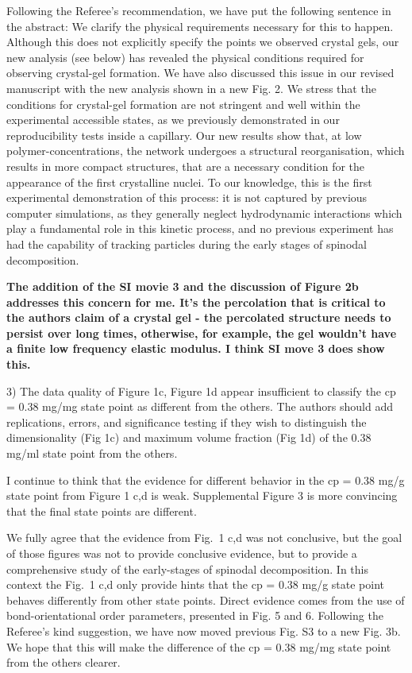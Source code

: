 \documentclass[11pt,a4paper]{article}
\newenvironment{referee}%
{\bigskip\singlespacing\bf}%
{\par\bigskip}
\begin{document}
Following the Referee's recommendation, we have put the following sentence in the abstract: We clarify the physical requirements necessary for this to happen. Although this does not explicitly specify the points we observed crystal gels, our new analysis (see below) 
has revealed the physical conditions required for observing crystal-gel formation. We have also discussed this issue in our revised manuscript with the new analysis shown in a new Fig. 2. We stress that the conditions for crystal-gel formation are not stringent and well within the experimental accessible states, as we previously demonstrated in our reproducibility tests inside a capillary. Our new results show that, at low polymer-concentrations, the network undergoes a structural reorganisation, which results in more compact structures, that are a necessary condition for the appearance of the first crystalline nuclei. To our knowledge, this is the first experimental demonstration of this process: it is not captured by previous computer simulations, as they generally neglect hydrodynamic interactions which play a fundamental role in this kinetic process, and no previous experiment has had the capability of tracking particles during the early stages of spinodal decomposition.

\begin{referee}
The addition of the SI movie 3 and the discussion of Figure 2b addresses this concern for me. It's the percolation that is critical to the authors claim of a crystal gel - the percolated structure needs to persist over long times, otherwise, for example, the gel wouldn't have a finite low frequency elastic modulus. I think SI move 3 does show this.

3) The data quality of Figure 1c, Figure 1d appear insufficient to classify the cp = 0.38 mg/mg state point as different from the others. The authors should add replications, errors, and significance testing if they wish to distinguish the dimensionality (Fig 1c) and maximum volume fraction (Fig 1d) of the 0.38 mg/ml state point from the others.

I continue to think that the evidence for different behavior in the cp = 0.38 mg/g state point from Figure 1 c,d is weak. Supplemental Figure 3 is more convincing that the final state points are different. 
\end{referee}

We fully agree that the evidence from Fig.~1 c,d was not conclusive, but the goal of those figures was not to provide conclusive evidence, but to provide a comprehensive study of the early-stages of spinodal decomposition. In this context the Fig.~1 c,d only provide hints that the cp = 0.38 mg/g state point behaves differently from other state points. Direct evidence comes from the use of bond-orientational order parameters, presented in Fig. 5 and 6. 
Following the Referee's kind suggestion, we have now moved previous Fig. S3 to a new Fig. 3b. 
We hope that this will make the difference of the cp = 0.38 mg/mg state point from the others clearer. 
\end{document}
